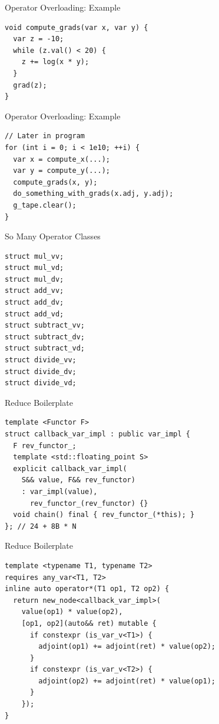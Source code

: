 \documentclass[dvipsnames, aspectratio=169]{beamer}
\begin{document}
\begin{frame}[fragile]{Operator Overloading: Example}
\begin{verbatim}
void compute_grads(var x, var y) {
  var z = -10;
  while (z.val() < 20) {
    z += log(x * y);
  }
  grad(z);
}
\end{verbatim}
\end{frame}

\begin{frame}[fragile]{Operator Overloading: Example}
\begin{verbatim}
// Later in program
for (int i = 0; i < 1e10; ++i) {
  var x = compute_x(...);
  var y = compute_y(...);
  compute_grads(x, y);
  do_something_with_grads(x.adj, y.adj);
  g_tape.clear();
}
\end{verbatim}
\end{frame}

\begin{frame}[fragile]{So Many Operator Classes}
\begin{verbatim}
struct mul_vv;
struct mul_vd;
struct mul_dv;
struct add_vv;
struct add_dv;
struct add_vd;
struct subtract_vv;
struct subtract_dv;
struct subtract_vd;
struct divide_vv;
struct divide_dv;
struct divide_vd;
\end{verbatim}
\end{frame}


\begin{frame}[fragile]{Reduce Boilerplate}
\begin{verbatim}
template <Functor F>
struct callback_var_impl : public var_impl {
  F rev_functor_;
  template <std::floating_point S>
  explicit callback_var_impl(
    S&& value, F&& rev_functor)
    : var_impl(value),
      rev_functor_(rev_functor) {}
  void chain() final { rev_functor_(*this); }
}; // 24 + 8B * N
\end{verbatim}
\end{frame}

\begin{frame}[fragile]{Reduce Boilerplate}
\begin{verbatim}
template <typename T1, typename T2>
requires any_var<T1, T2>
inline auto operator*(T1 op1, T2 op2) {
  return new_node<callback_var_impl>(
    value(op1) * value(op2),
    [op1, op2](auto&& ret) mutable {
      if constexpr (is_var_v<T1>) {
        adjoint(op1) += adjoint(ret) * value(op2);
      }
      if constexpr (is_var_v<T2>) {
        adjoint(op2) += adjoint(ret) * value(op1);
      }
    });
}
\end{verbatim}
\end{frame}
\end{document}
